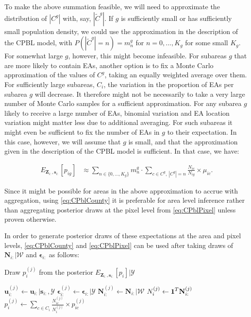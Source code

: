 \documentclass[12pt]{article}
\newcommand{\bmone}{\mbox{\bf 1}}
\begin{document}
To make the above summation feasible, we will need to approximate the distribution of $|C^g|$ with, say, $|\tilde{C}^g|$. If $g$ is sufficiently small or has sufficiently small population density, we could use the approximation in the description of the CPBL model, with $P(|\tilde{C}^g|=n) = m_n^g$ for $n=0,...,K_g$ for some small $K_g$. For somewhat large $g$, however, this might become infeasible. For subareas $g$ that are more likely to contain EAs, another option is to fix a Monte Carlo approximation of the values of $C^g$, taking an equally weighted average over them. For sufficiently large subareas, $C_i$, the variation in the proportion of EAs per subarea $g$ will decrease.  It therefore might not be necessarily to take a very large number of Monte Carlo samples for a sufficient approximation. For any subarea $g$ likely to receive a large number of EAs, binomial variation and EA location variation might matter less due to additional averaging. For such subareas it might even be sufficient to fix the number of EAs in $g$ to their expectation. In this case, however, we will assume that $g$ is small, and that the approximation given in the description of the CPBL model is sufficient. In that case, we have:

\begin{align}
E_{\boldsymbol{Z}_{i:},\boldsymbol{s}_{i:}}  \left [ p_{ig} \right ] & \approx  \sum_{n \in \{0,...,K_g\}} m_n^g  \cdot \sum_{c \in C^g, \ |C^g|=n} \frac{N_{ic}}{N_{ig}} \times \mu_{ic}. \label{eq:CPblPixel}
\end{align}

Since it might be possible for areas in the above approximation to accrue with aggregation, using \eqref{eq:CPblCounty} it is preferable for area level inference rather than aggregating posterior draws at the pixel level from \eqref{eq:CPblPixel} unless proven otherwise.

In order to generate posterior draws of these expectations at the area and pixel levels, \eqref{eq:CPblCounty} and \eqref{eq:CPblPixel} can be used after taking draws of $\boldsymbol{N}_{i:} \vert \mathscr{W}$ and $\boldsymbol{ \epsilon }_{i:}$ as follows:

\begin{algorithm}[H]
\caption{Draw $p_i^{(j)}$ from the posterior $E_{\boldsymbol{Z}_{i:},\boldsymbol{s}_{i:}}[p_i] \vert  \mathscr{Y}$}
\label{alg:main}
\begin{algorithmic}[1]
\STATE $\boldsymbol{u}_{i:}^{(j)} \leftarrow \boldsymbol{u}_{i:} \vert \mathbf{s}_{i:}, \mathscr{Y}$
\STATE $\boldsymbol{ \epsilon }_{i:}^{(j)} \leftarrow \boldsymbol{ \epsilon }_{i:}  \vert  \mathscr{Y} $
\STATE $\mathbf{N}_{i:}^{(j)} \leftarrow \mathbf{N}_{i:} \vert \mathscr{W}$
\STATE $N_i^{(j)} \leftarrow \bmone^T \mathbf{N}_{i:}^{(j)}$
\ENDFOR
\STATE $p_i^{(j)} \leftarrow  \sum_{c \in C_i} \frac{N_{ic}^{(j)}}{N_{i}^{(j)}} \times p_{ic}^{(j)}$
\end{algorithmic}
\end{algorithm}
\end{document}
